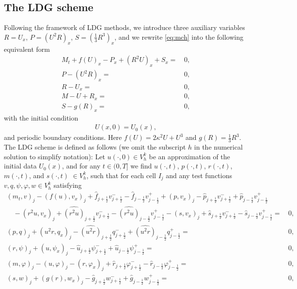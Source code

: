 \documentclass[11pt]{article}
\newcommand{\jbhalf}{j-\frac12}
\newcommand{\jfhalf}{j+\frac12}
\numberwithin{equation}{section}
\newcommand{\jl}{j-\frac 12}
\newcommand{\jr}{j+\frac 12}
\begin{document}
	\subsection{The LDG scheme}
	\label{sec2:1}
   Following the framework of LDG methods, we introduce three auxiliary variables $R=U_x$, $P=(U^2R)_x$, $S=(\frac 13 R^3)_x$, and we rewrite  \eqref{eq:mch} into the following equivalent form
   \begin{subequations}\label{eq:ldg}
   	\begin{align}
   		M_t + f(U)_x-P_x+(R^2U)_x+S_x =&\,0, \\
   		P-(U^2R)_x=&\, 0,\\
   		R-U_x=&\,0,\\
		M-U+R_x=&\,0,\\
		S-g(R)_x=&\,0,
   	\end{align}
   \end{subequations}
with the initial condition
\begin{align}
    U(x,0)=U_0(x),
\end{align}
and periodic boundary conditions. Here $f(U)=2\kappa^2 U+U^3$ and $g(R)=\frac 13 R^3$.
The LDG scheme is defined as follows (we omit the subscript $h$ in the numerical solution to simplify notation):
Let $u(\cdot,0)\in V_h^k$ be an approximation of the initial data $U_0(x)$, and for any $t\in(0,T]$ we find $u(\cdot,t)$, $p(\cdot,t)$, $r(\cdot,t)$, $m(\cdot,t)$, and $s(\cdot,t)$ $\in V_h^k$, such that for each cell $I_j$ and any test functions $v, q, \psi, \varphi, w \in V_h^k$ satisfying
		\begin{subequations}\label{eq:scheme:original}
		\begin{align}
			(m_{t}, v)_j -(f(u),v_x)_j +\hat{f}_{\jr}v^{-}_{\jr}-\hat{f}_{\jl}v^{+}_{\jl}+(p, v_x)_{j}-\hat{p}_{\jr}v^-_{\jr}+\hat{p}_{\jl}v^+_{\jl}\nonumber \\
		\quad -(r^2u, v_x)_j\!+\!\widehat{(r^2u)}_{\jr}v^-_{\jr}\!-\!\widehat{(r^2u)}_{\jl}v^+_{\jl}
		 -(s , v_x)_j\!+\!\widehat{s}_{\jr}v^-_{\jr}\!-\!\widehat{s}_{\jl}v^+_{\jl}= &\,0,\label{LDG:1:local}	
			\\
			(p, q)_j+(u^2r, q_x)_j -\widehat{(u^2r)}_{\jr}q^-_{\jr}+\widehat{(u^2r)}_{\jl}q^+_{\jl}= &\, 0,\label{LDG:2:local}	
			\\
			(r,\psi)_j+(u,\psi_x)_j -\hat{u}_{\jfhalf} \psi_{\jfhalf}^-+ \hat{u}_{\jbhalf} \psi_{\jbhalf}^+  = &\, 0, \label{LDG:3:local}	\\
			(m,\varphi)_j-(u, \varphi)_j-(r,\varphi_x)_j +\hat{r}_{\jfhalf} \varphi_{\jfhalf}^--\hat{r}_{\jbhalf} \varphi_{\jbhalf}^+  = &\, 0, \label{LDG:4:local}\\
			(s,w)_j +(g(r), w_x)_j -\hat{g}_{\jr}w^-_{\jr}+\hat{g}_{\jl}w^+_{\jl}= &\, 0, \label{LDG:5:local}		
		\end{align}
	\end{subequations}
\end{document}

